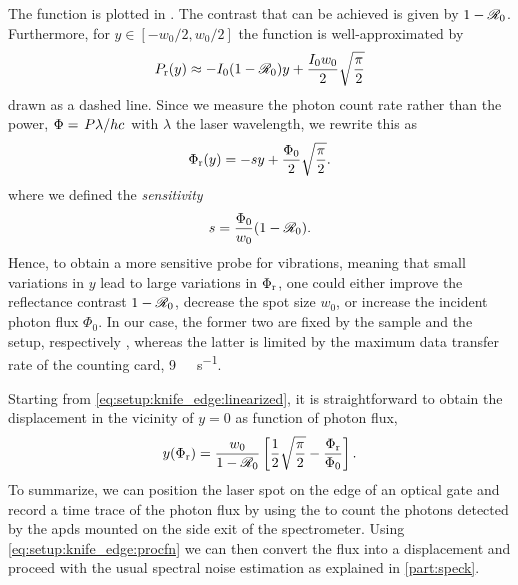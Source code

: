The function is plotted in .
The contrast that can be achieved is given by $1-\mathscr{R}_0$.
Furthermore, for $y\in[-w_0/2, w_0/2]$ the function is well-approximated by
\begin{equation}\label{eq:setup:knife_edge:approx}
    P_{\mathrm{r}}(y)\approx -I_0(1-\mathscr{R}_0)y + \frac{I_0 w_0}{2}\sqrt{\frac{\pi}{2}}
\end{equation}
drawn as a dashed line.
Since we measure the photon count rate rather than the power, $\Phi = \flatfrac{P\lambda}{hc}$ with $\lambda$ the laser wavelength, we rewrite this as
\begin{equation}\label{eq:setup:knife_edge:linearized}
    \Phi_{\mathrm{r}}(y) = -sy + \frac{\Phi_0}{2}\sqrt{\frac{\pi}{2}}.
\end{equation}
where we defined the \emph{sensitivity}
\begin{equation}\label{eq:setup:knife_edge:sensitivity}
    s = \frac{\Phi_0}{w_0}(1 - \mathscr{R}_0).
\end{equation}
Hence, to obtain a more sensitive probe for vibrations, meaning that small variations in $y$ lead to large variations in $\Phi_{\mathrm{r}}$, one could either improve the reflectance contrast $1-\mathscr{R}_0$, decrease the spot size $w_0$, or increase the incident photon flux $\Phi_0$.
In our case, the former two are fixed by the sample and the setup, respectively , whereas the latter is limited by the maximum data transfer rate of the \tagger counting card, \qty{9}{\mega\sample\per\second}.

Starting from \cref{eq:setup:knife_edge:linearized}, it is straightforward to obtain the displacement in the vicinity of $y=0$ as function of photon flux,
\begin{equation}\label{eq:setup:knife_edge:procfn}
     y(\Phi_{\mathrm{r}}) = \frac{w_0}{1-\mathscr{R}_0}\left[\frac{1}{2}\sqrt{\frac{\pi}{2}} - \frac{\Phi_{\mathrm{r}}}{\Phi_0}\right].
\end{equation}
To summarize, we can position the laser spot on the edge of an optical gate and record a time trace of the photon flux by using the \taggershort to count the photons detected by the \glspl{apd} mounted on the side exit of the spectrometer.
Using \cref{eq:setup:knife_edge:procfn} we can then convert the flux into a displacement and proceed with the usual spectral noise estimation as explained in \cref{part:speck}.

